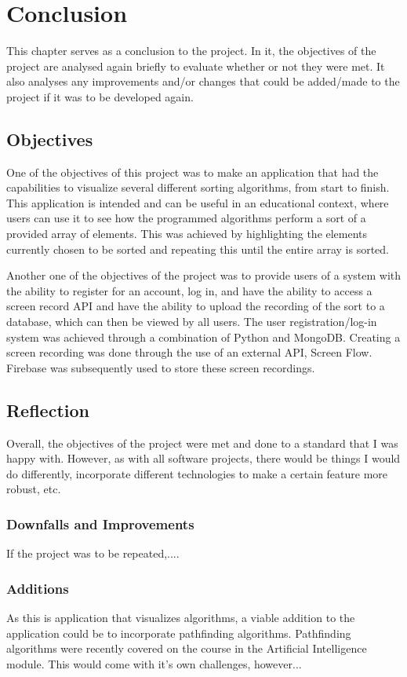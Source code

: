 \chapter{Conclusion}
This chapter serves as a conclusion to the project. In it, the objectives of the project are analysed again briefly to evaluate whether or not they were met. It also analyses any improvements and/or changes that could be added/made to the project if it was to be developed again.

\section{Objectives}
One of the objectives of this project was to make an application that had the capabilities to visualize several different sorting algorithms, from start to finish. This application is intended and can be useful in an educational context, where users can use it to see how the programmed algorithms perform a sort of a provided array of elements. This was achieved by highlighting the elements currently chosen to be sorted and repeating this until the entire array is sorted. 
\par
\bigskip
Another one of the objectives of the project was to provide users of a system with the ability to register for an account, log in, and have the ability to access a screen record API and have the ability to upload the recording of the sort to a database, which can then be viewed by all users. The user registration/log-in system was achieved through a combination of Python and MongoDB. Creating a screen recording was done through the use of an external API, Screen Flow. Firebase was subsequently used to store these screen recordings.

\section{Reflection}
Overall, the objectives of the project were met and done to a standard that I was happy with. However, as with all software projects, there would be things I would do differently, incorporate different technologies to make a certain feature more robust, etc.

\subsection{Downfalls and Improvements}
If the project was to be repeated,....

\subsection{Additions}
As this is application that visualizes algorithms, a viable addition to the application could be to incorporate pathfinding algorithms. Pathfinding algorithms were recently covered on the course in the Artificial Intelligence module. This would come with it's own challenges, however...

